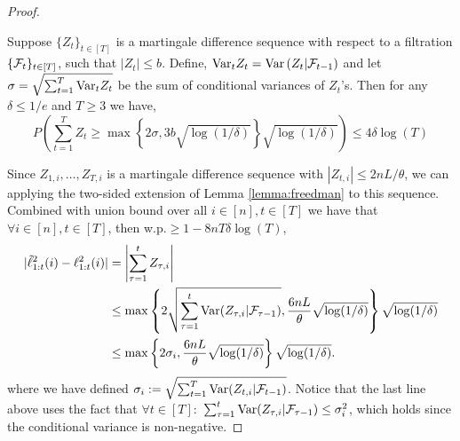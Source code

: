 \begin{proof}
\begin{lemma}\label{lemma:freedman}
Suppose \linebreak $\{Z_t\}_{t\in[T]}$ is a martingale difference sequence with respect to a filtration $\{\mathcal{F}_t\}_{t\in[T]}$, such that $|Z_t|\leq b$. Define,
$
\text{Var}_t Z_t = \text{Var}\left(Z_t \vert \mathcal{F}_{t-1}\right)
$
and  let $\sigma= \sqrt{\sum_{t=1}^T\text{Var}_t Z_t} $ be the sum of conditional variances of $Z_t$'s. Then for any $\delta\leq 1/e$ and 
$T\geq 3$ we have,
$$
P\left( \sum_{t=1}^TZ_t \geq  \max\left\{2\sigma, 3b\sqrt{\log(1/\delta)} \right\}\sqrt{\log(1/\delta)} 
 \right) \leq  4\delta\log(T)
$$
\end{lemma}
Since  $Z_{1, i}, \dots, Z_{T,i}$ is a martingale difference sequence with $|Z_{t,i}| \leq 2nL/\theta$, we can
  applying the two-sided extension of Lemma \ref{lemma:freedman} to this sequence. Combined with union bound over all \linebreak $i\in[n], t\in[T]$ we have that   $\forall i\in[n], t\in[T]$, then w.p.$\geq 1- 8nT\delta\log(T)$,
 \begin{align}\label{eq:Friedman11}
 | \tilde{\ell}_{1:t}^2(i) - \ell_{1:t}^2(i) |
 &=
  \left| \sum_{\tau=1}^t Z_{\tau,i} \right|  \nonumber\\
   &\leq
   \max \left\{ 2 \sqrt{\sum_{\tau=1}^t \text{Var}(Z_{\tau,i}\vert \mathcal{F}_{\tau-1})}, \frac{6nL}{\theta}\sqrt{\log(1/\delta)} \right\} \sqrt{\log(1/\delta)}  \nonumber\\
 & \leq
 \max \left\{ 2\sigma_i, \frac{6nL}{\theta}\sqrt{\log(1/\delta)} \right\} \sqrt{\log(1/\delta)}. 
 \end{align}
 where we have defined
 $
\sigma_i: = \sqrt{\sum_{t=1}^T \text{Var}(Z_{t,i}\vert \mathcal{F}_{t-1})}
$.  Notice that the last line above uses the fact that $\forall t \in [T]:$ $\sum_{\tau=1}^t \text{Var}(Z_{\tau,i}\vert \mathcal{F}_{\tau-1}) \leq \sigma_i^2$, which holds since the conditional variance is non-negative.


\end{proof}
